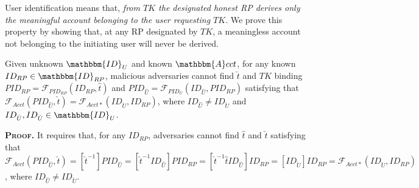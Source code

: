 





User identification means that,
\emph{from $TK$ the designated honest RP derives only the meaningful account belonging to the user requesting $TK$}.
We prove this property by showing that,
    at any RP designated by $TK$,
        a meaningless account not belonging to the initiating user will never be derived.

\vspace{1.5mm}
\begin{thm} Given unknown $\mathbbm{ID}_U$ and known $\mathbbm{A}cct$,
for any known $ID_{RP} \in \mathbbm{ID}_{RP}$, 
     malicious adversaries cannot find $\check{t}$ and $TK$ binding $PID_{RP} = \mathcal{F}_{PID_{RP}}(ID_{RP}, \hat{t})$
     and $PID_{\hat{U}}=\mathcal{F}_{PID_U}(ID_{\hat{U}}, PID_{RP})$ satisfying that $\mathcal{F}_{Acct}(PID_{\hat{U}}, \check{t}) = \mathcal{F}_{Acct\ast}(ID_{\check{U}}, ID_{RP})$, where $ID_{\hat{U}} \neq ID_{\check{U}}$ and $ID_{\hat{U}},ID_{\check{U}} \in \mathbbm{ID}_U$.
\label{thm-u-id}
\end{thm}

\noindent\textbf{\textsc{Proof.}}
It requires that, for any $ID_{RP}$, adversaries cannot find $\hat{t}$ and $\check{t}$ satisfying that $\mathcal{F}_{Acct}(PID_{\hat{U}}, \check{t}) = [\check{t}^{-1}]PID_{\hat{U}} = [\check{t}^{-1}ID_{\hat{U}}]PID_{RP}
= [\check{t}^{-1}\hat{t}ID_{\hat{U}}]ID_{RP}
    = [ID_{\check{U}}]ID_{RP} = \mathcal{F}_{Acct\ast}(ID_{\check{U}}, ID_{RP})$,
where $ID_{\hat{U}} \neq ID_{\check{U}}$.

